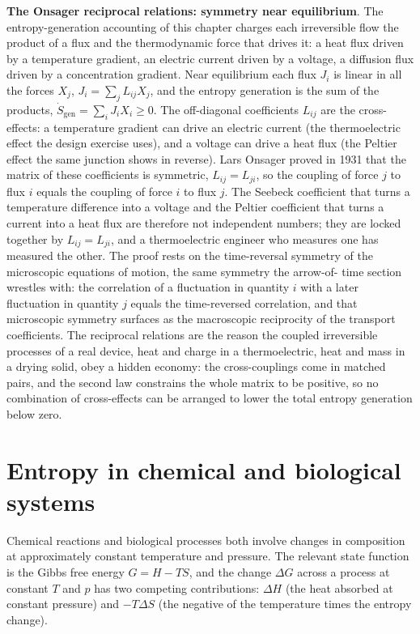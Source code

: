 \begin{mastery}
\textbf{The Onsager reciprocal relations: symmetry near equilibrium}. The
entropy-generation accounting of this chapter charges each irreversible flow the
product of a flux and the thermodynamic force that drives it: a heat flux driven
by a temperature gradient, an electric current driven by a voltage, a diffusion
flux driven by a concentration gradient. Near equilibrium each flux $J_i$ is
linear in all the forces $X_j$, $J_i = \sum_j L_{ij} X_j$, and the entropy
generation is the sum of the products, $\dot S_{\text{gen}} = \sum_i J_i X_i \ge
0$. The off-diagonal coefficients $L_{ij}$ are the cross-effects: a temperature
gradient can drive an electric current (the thermoelectric effect the design
exercise uses), and a voltage can drive a heat flux (the Peltier effect the same
junction shows in reverse). Lars Onsager proved in 1931 that the matrix of these
coefficients is symmetric, $L_{ij} = L_{ji}$, so the coupling of force $j$ to
flux $i$ equals the coupling of force $i$ to flux $j$. The Seebeck coefficient
that turns a temperature difference into a voltage and the Peltier coefficient
that turns a current into a heat flux are therefore not independent numbers; they
are locked together by $L_{ij} = L_{ji}$, and a thermoelectric engineer who
measures one has measured the other. The proof rests on the time-reversal
symmetry of the microscopic equations of motion, the same symmetry the arrow-of-
time section wrestles with: the correlation of a fluctuation in quantity $i$ with
a later fluctuation in quantity $j$ equals the time-reversed correlation, and
that microscopic symmetry surfaces as the macroscopic reciprocity of the
transport coefficients. The reciprocal relations are the reason the coupled
irreversible processes of a real device, heat and charge in a thermoelectric,
heat and mass in a drying solid, obey a hidden economy: the cross-couplings come
in matched pairs, and the second law constrains the whole matrix to be positive,
so no combination of cross-effects can be arranged to lower the total entropy
generation below zero.
\end{mastery}

\section{Entropy in chemical and biological systems}

Chemical reactions and biological processes both involve changes in
composition at approximately constant temperature and pressure. The
relevant state function is the Gibbs free energy $G = H - TS$, and
the change $\Delta G$ across a process at constant $T$ and $p$ has
two competing contributions: $\Delta H$ (the heat absorbed at
constant pressure) and $-T \Delta S$ (the negative of the
temperature times the entropy change).

